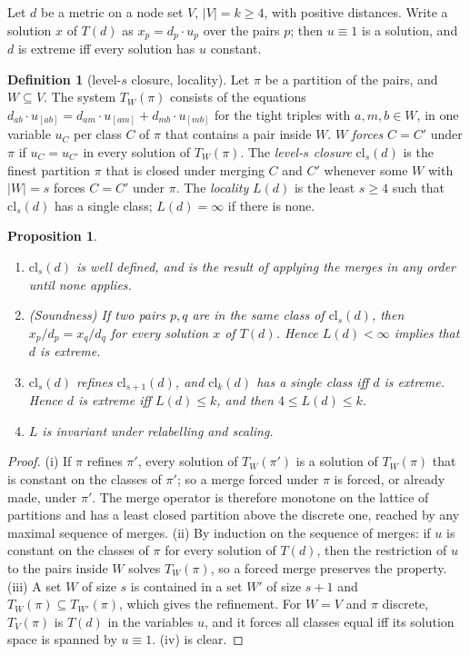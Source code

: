 \documentclass[11pt,a4paper]{article}
\newtheorem{proposition}[theorem]{Proposition}
\theoremstyle{definition}
\newtheorem*{definition}{Definition}
\theoremstyle{remark}
\newcommand{\cl}{\mathrm{cl}}
\begin{document}
Let $d$ be a metric on a node set $V$, $|V| = k \ge 4$, with positive distances. Write a solution $x$ of $T(d)$ as
$x_p = d_p\cdot u_p$ over the pairs $p$; then $u \equiv 1$ is a solution, and $d$ is extreme iff every solution has
$u$ constant.

\begin{definition}[level-$s$ closure, locality]
Let $\pi$ be a partition of the pairs, and $W \subseteq V$. The system $T_W(\pi)$ consists of the equations
$d_{ab}\cdot u_{[ab]} = d_{am}\cdot u_{[am]} + d_{mb}\cdot u_{[mb]}$ for the tight triples with $a, m, b \in W$, in
one variable $u_C$ per class $C$ of $\pi$ that contains a pair inside $W$. $W$ \emph{forces} $C = C'$ under $\pi$ if
$u_C = u_{C'}$ in every solution of $T_W(\pi)$. The \emph{level-$s$ closure} $\cl_s(d)$ is the finest partition
$\pi$ that is closed under merging $C$ and $C'$ whenever some $W$ with $|W| = s$ forces $C = C'$ under $\pi$. The
\emph{locality} $L(d)$ is the least $s \ge 4$ such that $\cl_s(d)$ has a single class; $L(d) = \infty$ if there is
none.
\end{definition}

\begin{proposition}\label{prop:closure}
\begin{enumerate}[label=\textup{(\roman*)},leftmargin=*]
\item $\cl_s(d)$ is well defined, and is the result of applying the merges in any order until none applies.
\item (Soundness) If two pairs $p, q$ are in the same class of $\cl_s(d)$, then $x_p/d_p = x_q/d_q$ for every
  solution $x$ of $T(d)$. Hence $L(d) < \infty$ implies that $d$ is extreme.
\item $\cl_s(d)$ refines $\cl_{s+1}(d)$, and $\cl_k(d)$ has a single class iff $d$ is extreme. Hence $d$ is extreme
  iff $L(d) \le k$, and then $4 \le L(d) \le k$.
\item $L$ is invariant under relabelling and scaling.
\end{enumerate}
\end{proposition}

\begin{proof}
(i) If $\pi$ refines $\pi'$, every solution of $T_W(\pi')$ is a solution of $T_W(\pi)$ that is constant on the
classes of $\pi'$; so a merge forced under $\pi$ is forced, or already made, under $\pi'$. The merge operator is
therefore monotone on the lattice of partitions and has a least closed partition above the discrete one, reached by
any maximal sequence of merges. (ii) By induction on the sequence of merges: if $u$ is constant on the classes of
$\pi$ for every solution of $T(d)$, then the restriction of $u$ to the pairs inside $W$ solves $T_W(\pi)$, so a
forced merge preserves the property. (iii) A set $W$ of size $s$ is contained in a set $W'$ of size $s + 1$ and
$T_W(\pi) \subseteq T_{W'}(\pi)$, which gives the refinement. For $W = V$ and $\pi$ discrete, $T_V(\pi)$ is $T(d)$
in the variables $u$, and it forces all classes equal iff its solution space is spanned by $u \equiv 1$. (iv) is
clear.
\end{proof}
\end{document}
